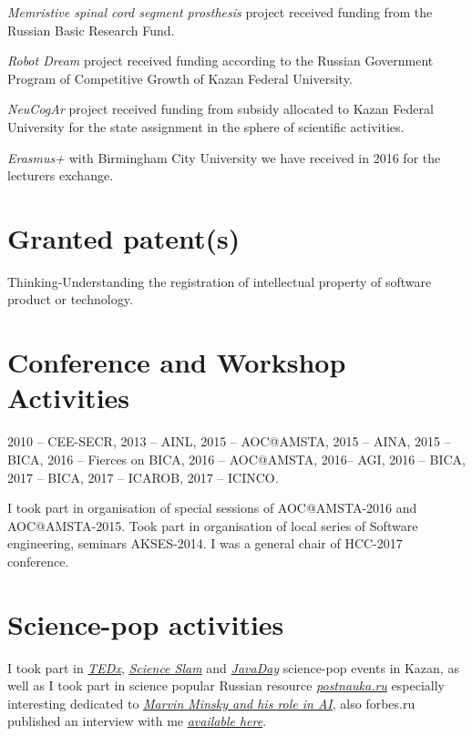 \documentclass{moderncv}
\begin{document}
\emph{Memristive spinal cord segment prosthesis} project received funding from the Russian Basic Research Fund.

\emph{Robot Dream} project received funding according to the Russian Government Program of Competitive Growth of Kazan Federal University.

\emph{NeuCogAr} project received funding from subsidy allocated to Kazan Federal University for the state assignment in the sphere of scientific activities.

\emph{Erasmus+} with Birmingham City University we have received in 2016 for the lecturers exchange. 

\section{Granted patent(s)}

Thinking-Understanding the registration of intellectual property of software product or technology.

 
\nocite{*}
\printbibliography[title={Papers}]

\cvitem{}{}

\section{Conference and Workshop Activities}

2010 -- CEE-SECR, 2013 -- AINL, 2015 -- AOC@AMSTA, 2015 -- AINA, 2015 -- BICA, 2016 -- Fierces on BICA, 2016 -- AOC@AMSTA, 2016-- AGI, 2016 -- BICA, 2017 -- BICA, 2017 -- ICAROB, 2017 -- ICINCO.

I took part in organisation of special sessions of AOC@AMSTA-2016 and AOC@AMSTA-2015. Took part in organisation of local series of Software engineering, seminars AKSES-2014. I was a general chair of HCC-2017 conference.

\section{Science-pop activities}

I took part in \href{https://www.youtube.com/watch?v=BLvS7h3kRbo}{\emph{TEDx}}, \href{https://vk.com/video-87488544_171504962}{\emph{Science Slam}} and \href{https://www.youtube.com/watch?v=sLLKxvUEA7E}{\emph{JavaDay}} science-pop events in Kazan, as well as I took part in science popular Russian resource \href{https://postnauka.ru/author/talanov}{\emph{postnauka.ru}} especially interesting dedicated to \href{https://postnauka.ru/faq/58727}{\emph{Marvin Minsky and his role in AI}}, also forbes.ru published an interview with me \href{http://www.forbes.ru/mneniya-column/288097-kak-sozdat-emotsionalnyi-iskusstvennyi-intellekt}{\emph{available here}}.
\end{document}
